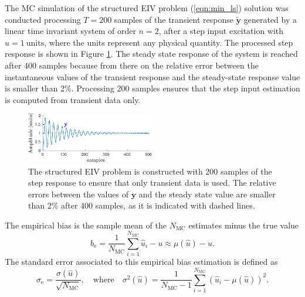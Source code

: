 The MC simulation of the structured EIV problem (\ref{eqn:min_ls}) solution was conducted processing $T = 200$ samples of the transient response $\widetilde{\mathbf{y}}$ generated by a linear time invariant system of order $n = 2$, after a step input excitation with $u = 1 \ \mathrm{units}$, where the units represent any physical quantity. 
The processed step response is shown in Figure \ref{fig:y}.
The steady state response of the system is reached after 400 samples because from there on the relative error between the instantaneous values of the transient response and the steady-state response value is smaller than 2\%.
Processing 200 samples ensures that the step input estimation is computed from transient data only.

\begin{figure}[htb!]
\centering
\includegraphics[width=0.5\textwidth]{./ChapterStatisticalAnalysis/fig/Fig_5.pdf} 
\caption{ \label{fig:y} The structured EIV problem is constructed with 200 samples of the step response to ensure that only transient data is used. The relative errors between the values of $\mathbf{y}$ and the steady state value are smaller than 2\% after 400 samples, as it is indicated with dashed lines. } 
\end{figure}

The empirical bias is the sample mean of the $N_{\mathrm{MC}}$ estimates minus the true value
 \begin{equation} {b}_\mathrm{e} = \frac{1}{N_{\mathrm{MC}}} \sum_{i=1}^{N_{\mathrm{MC}}}{ \widehat{u}_i - u } \approx \mu \left( \widehat{u} \right) - u. \end{equation}
The standard error associated to this empirical bias estimation \cite{Hammersley75} is defined as 
\begin{equation} \sigma_\mathrm{e} = \frac{\sigma \left( \widehat{u} \right) }{\sqrt{N_{\mathrm{MC}}}}, \quad \mathrm{where} \quad \sigma^2 \left( \widehat{u} \right) = \frac{1}{N_{\mathrm{MC}}-1} \sum_{i=1}^{N_{\mathrm{MC}}}{ \left( { \widehat{u}}_i - \mu \left( \widehat{u} \right) \right)^2 } . \end{equation} 

